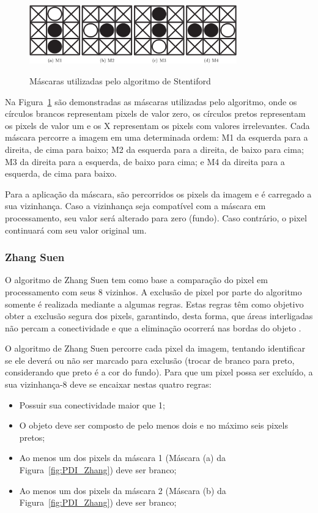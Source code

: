 \documentclass[12pt,oneside,a4paper,english,french,spanish,brazil,]{abntex2}
\begin{document}
\begin{figure}[ht]
\centering
\caption{Máscaras utilizadas pelo algoritmo de Stentiford}
\includegraphics[width=0.8\textwidth]{imagens/PDI_Stentiford_1.PNG}
\label{fig:PDI_Stentiford_1}
\end{figure}

Na Figura~\ref{fig:PDI_Stentiford_1} são demonstradas as máscaras utilizadas pelo algoritmo, onde os círculos brancos representam pixels de valor zero, os círculos pretos representam os pixels de valor um e os X representam os pixels com valores irrelevantes. Cada máscara percorre a imagem em uma determinada ordem: M1 da esquerda para a direita, de cima para baixo; M2 da esquerda para a direita, de baixo para cima; M3 da direita para a esquerda, de baixo para cima; e M4 da direita para a esquerda, de cima para baixo.

Para a aplicação da máscara, são percorridos os pixels da imagem e é carregado a sua vizinhança. Caso a vizinhança seja compatível com a máscara em processamento, seu valor será alterado para zero (fundo). Caso contrário, o pixel continuará com seu valor original um.

\subsubsection{Zhang Suen}

O algoritmo de Zhang Suen \cite{zhang:1984} tem como base a comparação do pixel em processamento com seus 8 vizinhos. A exclusão de pixel por parte do algoritmo somente é realizada mediante a algumas regras. Estas regras têm como objetivo obter a exclusão segura dos pixels, garantindo, desta forma, que áreas interligadas não percam a conectividade e que a eliminação ocorrerá nas bordas do objeto \cite{guilherme:2007}.

O algoritmo de Zhang Suen percorre cada pixel da imagem, tentando identificar se ele deverá ou não ser marcado para exclusão (trocar de branco para preto, considerando que preto é a cor do fundo). Para que um pixel possa ser excluído, a sua vizinhança-8 deve se encaixar nestas quatro regras:
\begin{itemize}
\item Possuir sua conectividade maior que 1;
\item O objeto deve ser composto de pelo menos dois e no máximo seis pixels pretos;
\item Ao menos um dos pixels da máscara 1 (Máscara (a) da Figura~\ref{fig:PDI_Zhang}) deve ser branco;
\item Ao menos um dos pixels da máscara 2 (Máscara (b) da Figura~\ref{fig:PDI_Zhang}) deve ser branco;
\end{itemize}
\end{document}
